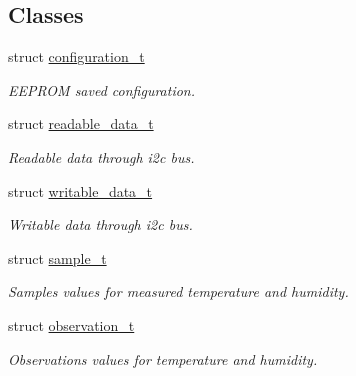 \subsection*{Classes}
\begin{DoxyCompactItemize}
\item 
struct \hyperlink{structconfiguration__t}{configuration\+\_\+t}
\begin{DoxyCompactList}\small\item\em E\+E\+P\+R\+OM saved configuration. \end{DoxyCompactList}\item 
struct \hyperlink{structreadable__data__t}{readable\+\_\+data\+\_\+t}
\begin{DoxyCompactList}\small\item\em Readable data through i2c bus. \end{DoxyCompactList}\item 
struct \hyperlink{structwritable__data__t}{writable\+\_\+data\+\_\+t}
\begin{DoxyCompactList}\small\item\em Writable data through i2c bus. \end{DoxyCompactList}\item 
struct \hyperlink{structsample__t}{sample\+\_\+t}
\begin{DoxyCompactList}\small\item\em Samples values for measured temperature and humidity. \end{DoxyCompactList}\item 
struct \hyperlink{structobservation__t}{observation\+\_\+t}
\begin{DoxyCompactList}\small\item\em Observations values for temperature and humidity. \end{DoxyCompactList}\end{DoxyCompactItemize}
